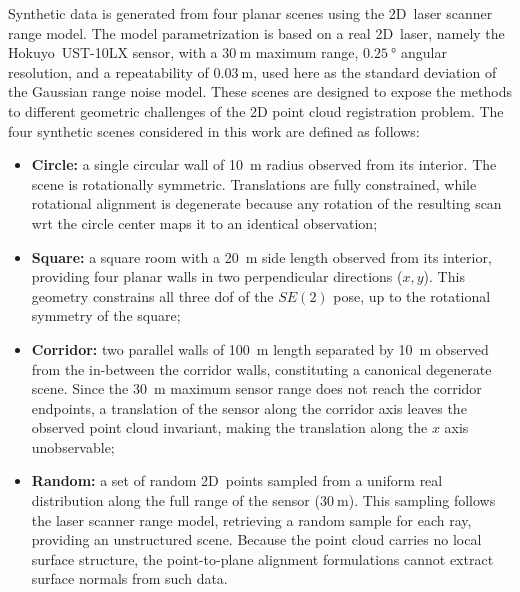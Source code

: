Synthetic data is generated from four planar scenes using
the 2D~laser scanner range model. The model parametrization is based on
a real 2D~laser, namely the Hokuyo~UST-10LX sensor, with a
$\SI{30}{\metre}$ maximum range, $\SI{0.25}{\degree}$ angular resolution,
and a repeatability of $\SI{0.03}{\metre}$, used here as
the standard deviation of the Gaussian range noise model.
These scenes are designed to expose the methods to
different geometric challenges of the 2D point cloud registration problem.
The four synthetic scenes considered in this work are defined as follows:
\begin{itemize}
\item \textbf{Circle:} a single circular wall of \SI{10}{\metre} radius
      observed from its interior.
      The scene is rotationally symmetric.
      Translations are fully constrained, while rotational alignment is
      degenerate because any rotation of the resulting scan \gls{wrt}
      the circle center maps it to an identical observation;
\item \textbf{Square:} a square room with a \SI{20}{\metre} side length
      observed from its interior,
      providing four planar walls in two perpendicular directions ($x, y$).
      This geometry constrains all three \gls{dof} of the $SE(2)$ pose,
      up to the rotational symmetry of the square;
\item \textbf{Corridor:} two parallel walls of \SI{100}{\metre} length
      separated by \SI{10}{\metre} observed from the in-between the corridor
      walls, constituting a canonical degenerate scene.
      Since the \SI{30}{\metre} maximum sensor range does not reach
      the corridor endpoints, a translation of the sensor along the corridor
      axis leaves the observed point cloud invariant,
      making the translation along the $x$ axis unobservable;
\item \textbf{Random:} a set of random 2D~points sampled from a uniform real
      distribution along the full range of the sensor ($\SI{30}{\metre}$).
      This sampling follows the laser scanner range model, retrieving a random
      sample for each ray, providing an unstructured scene.
      Because the point cloud carries no local surface structure,
      the point-to-plane alignment formulations
      cannot extract surface normals from such data.
\end{itemize}

